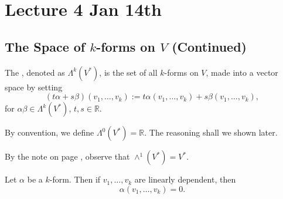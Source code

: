 \documentclass[notoc,notitlepage]{tufte-book}
\begin{document}


\chapter{Lecture 4 Jan 14th}%
\label{chp:lecture_4_jan_14th}

\section{The Space of \texorpdfstring{$k$}{k}-forms on \texorpdfstring{$V$}{V} (Continued)}%
\label{sec:the_space_of_k_forms_on_v_continued}

\begin{defn}\label{defn:space_of_k_forms_on_v_}
  The , denoted as $\Lambda^k \left( V^* \right)$, is
  the set of all $k$-forms on $V$, made into a vector space by setting
  \begin{equation*}
    (t\alpha + s\beta)(v_1, \ldots, v_k) :=
      t\alpha(v_1, \ldots, v_k) + s\beta(v_1, \ldots, v_k),
  \end{equation*}
  for $\alpha \beta \in \Lambda^k \left( V^* \right)$, $t, s \in \mathbb{R}$.
\end{defn}

\begin{note}
  By convention, we define $\Lambda^0 \left( V^* \right) = \mathbb{R}$. The reasoning shall
  we shown later. %
\end{note}

\begin{note}
  By the note on page \pageref{remark:permutations}, observe that
  $\wedge^1 \left( V^* \right) = V^*$.
\end{note}

\begin{propo}\label{propo:a_k_form_is_equivalently_0_if_its_arguments_are_linearly_dependent}
  Let $\alpha$ be a $k$-form. Then if $v_1, \ldots, v_k$ are linearly dependent, then
  \begin{equation*}
    \alpha(v_1, \ldots, v_k) = 0.
  \end{equation*}
\end{propo}
\end{document}
